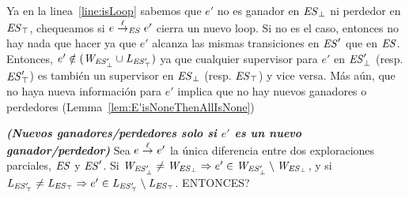 Ya en la linea~\ref{line:isLoop} sabemos que $e'$ no es ganador en $\mathit{\mathit{ES}_{\bot}}$ ni perdedor en $\mathit{\mathit{ES}_{\top}}$, chequeamos si $e 
\overset{\ell}{\rightarrow}_{\mathit{ES}} e'$ cierra un nuevo loop. Si no es el caso, entonces no hay nada que hacer ya que $e'$ alcanza las mismas transiciones en $\mathit{ES}'$ que en $\mathit{ES}$. Entonces, $e' \notin 
(\mathit{W_{\mathit{\mathit{ES}'_{\bot}}}} \cup \mathit{L_{\mathit{\mathit{ES}'_{\top}}}})$ ya que cualquier supervisor para $e'$ en $\mathit{\mathit{ES}'_{\bot}}$ (resp. $\mathit{\mathit{ES}'_{\top}}$) es también un supervisor en $\mathit{\mathit{ES}_{\bot}}$ (resp. 
$\mathit{\mathit{ES}_{\top}}$) y vice versa.
%
%
Más aún, que no haya nueva información para $e'$ implica que no hay nuevos ganadores o perdedores (Lemma~\ref{lem:E'isNoneThenAllIsNone})

\begin{lemma}\textbf{\emph{(Nuevos ganadores/perdedores solo si $e'$ es un nuevo ganador/perdedor)}}
\label{lem:E'isNoneThenAllIsNone}
Sea $e \overset{\ell}{\rightarrow}_{} e'$ la única diferencia entre dos exploraciones parciales, $\mathit{ES}$ y $\mathit{ES}'$. Si $\mathit{W_{\mathit{\mathit{ES}'_{\bot}}}} \neq \mathit{W_{\mathit{\mathit{ES}_{\bot}}}} \Rightarrow e' \in \mathit{W_{\mathit{\mathit{ES}'_{\bot}}}} \setminus \mathit{W_{\mathit{\mathit{ES}_{\bot}}}}$, y si $\mathit{L_{\mathit{\mathit{ES}'_{\top}}}} \neq \mathit{L_{\mathit{\mathit{ES}_{\top}}}} \Rightarrow e' \in \mathit{L_{\mathit{\mathit{ES}'_{\top}}}} \setminus \mathit{L_{\mathit{\mathit{ES}_{\top}}}}$. ENTONCES?
\end{lemma}

